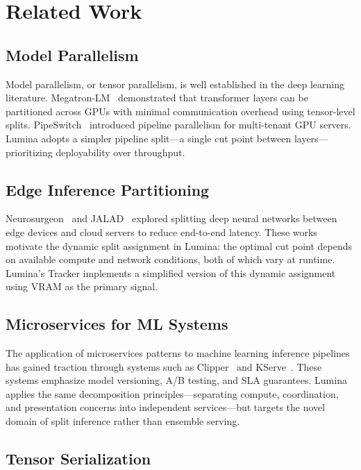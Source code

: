 \documentclass[conference]{IEEEtran}
\begin{document}
\section{Related Work}

\subsection{Model Parallelism}

Model parallelism, or tensor parallelism, is well established in the deep
learning literature. Megatron-LM~\cite{shoeybi2019megatron} demonstrated that
transformer layers can be partitioned across GPUs with minimal communication
overhead using tensor-level splits. PipeSwitch~\cite{bai2020pipeswitch}
introduced pipeline parallelism for multi-tenant GPU servers. Lumina adopts a
simpler pipeline split---a single cut point between layers---prioritizing
deployability over throughput.

\subsection{Edge Inference Partitioning}

Neurosurgeon~\cite{kang2017neurosurgeon} and JALAD~\cite{li2018jalad} explored
splitting deep neural networks between edge devices and cloud servers to reduce
end-to-end latency. These works motivate the dynamic split assignment in
Lumina: the optimal cut point depends on available compute and network
conditions, both of which vary at runtime. Lumina's Tracker implements a
simplified version of this dynamic assignment using VRAM as the primary signal.

\subsection{Microservices for ML Systems}

The application of microservices patterns to machine learning inference
pipelines has gained traction through systems such as Clipper~\cite{crankshaw2017clipper}
and KServe~\cite{kserve2023}. These systems emphasize model versioning, A/B
testing, and SLA guarantees. Lumina applies the same decomposition
principles---separating compute, coordination, and presentation concerns into
independent services---but targets the novel domain of split inference rather
than ensemble serving.

\subsection{Tensor Serialization}
\end{document}
